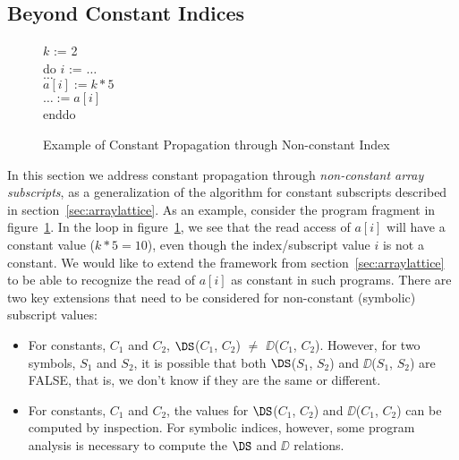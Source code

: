 \subsection{Beyond Constant Indices}
\label{sec:non-const}
\begin{figure}
\begin{center}
\parbox{3.0in}{
\begin{programa}
\Ta $k$ := 2 \\
\Ta do $i$ := $\ldots$ \\
\Tb  $\ldots$ \\
\Tb  $a[i] := k * 5$ \\
\Tb  $\ldots := a[i]$ \\
\Ta enddo \\
\end{programa}
}
\end{center}
\caption{Example of Constant Propagation through Non-constant Index}
\label{fig:non-const-ex-source}
\end{figure}

In this section we address constant propagation
through {\it non-constant array subscripts}, as a generalization
of the algorithm
for constant subscripts described in section~\ref{sec:arraylattice}.
As an example, consider the program fragment in
figure~\ref{fig:non-const-ex-source}.  In the loop in
figure~\ref{fig:non-const-ex-source}, we see that the read access of
$a[i]$ will have a constant value ($k*5=10$), even though the
index/subscript value $i$ is not a constant.  We would like to extend
the framework from section~\ref{sec:arraylattice}  to be
able to recognize the read of $a[i]$ as constant in such programs.
There are two key extensions that need to be considered
for non-constant (symbolic) subscript values:
\begin{itemize}

\item  For constants, $C_1$ and $C_2$, $\DS$($C_1$, $C_2$) $\neq$ 
$\DD$($C_1$, $C_2$). However, for two symbols,  $S_1$ and $S_2$,
it is possible that both $\DS$($S_1$, $S_2$) and $\DD$($S_1$,
$S_2$) are FALSE, that is, we don't know if they are the same or different.

\item For constants, $C_1$ and $C_2$, the values for $\DS$($C_1$, $C_2$) and 
$\DD$($C_1$, $C_2$) can be computed by inspection. For symbolic
indices, however, some program analysis is necessary
to compute the $\DS$ and $\DD$ relations.
\end{itemize} 

